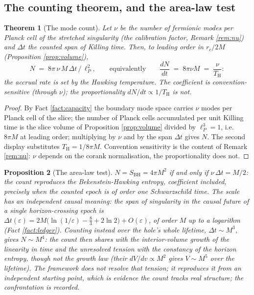 \documentclass[11pt]{article}
\newtheorem{theorem}{Theorem}[section]
\newtheorem{proposition}[theorem]{Proposition}
\theoremstyle{definition}
\renewcommand{\TH}{T_{\mathrm{H}}} %
\newcommand{\lP}{\ell_{P}}
\newcommand{\SBH}{S_{\mathrm{BH}}}
\begin{document}
\subsection{The counting theorem, and the area-law test}\label{subsec:countthm}

\begin{theorem}[The mode count]\label{thm:count}
Let $\nu$ be the number of fermionic modes per Planck cell of the stretched singularity (the calibration factor, Remark \ref{rem:nu}) and $\Delta t$ the counted span of Killing time. Then, to leading order in $r_c/2M$ (Proposition \ref{prop:volume}),
\[
N \;=\; 8\pi\,\nu\,M\,\Delta t\,/\,\lP^2,
\qquad\text{equivalently}\qquad
\frac{dN}{dt} \;=\; 8\pi\nu M \;=\; \frac{\nu}{\TH}:
\]
the accrual rate is set by the Hawking temperature. The coefficient is convention-sensitive (through $\nu$); the proportionality $dN/dt \propto 1/\TH$ is not.
\end{theorem}

\begin{proof}
By Fact \ref{fact:capacity} the boundary mode space carries $\nu$ modes per Planck cell of the slice; the number of Planck cells accumulated per unit Killing time is the slice volume of Proposition \ref{prop:volume} divided by $\lP^3 = 1$, i.e.\ $8\pi M$ at leading order; multiplying by $\nu$ and by the span $\Delta t$ gives $N$. The second display substitutes $\TH = 1/8\pi M$. Convention sensitivity is the content of Remark \ref{rem:nu}: $\nu$ depends on the corank normalisation, the proportionality does not.
\end{proof}

\begin{proposition}[The area-law test]\label{prop:arealaw}
$N = \SBH = 4\pi M^2$ if and only if $\nu\,\Delta t = M/2$: the count reproduces the Bekenstein-Hawking entropy, coefficient included, precisely when the counted epoch is of order one Schwarzschild time. The scale has an independent causal meaning: the span of singularity in the causal future of a single horizon-crossing epoch is $\Delta t(\varepsilon) = 2M\bigl(\ln(1/\varepsilon) - \tfrac83 + 2\ln 2\bigr) + O(\varepsilon)$, of order $M$ up to a logarithm (Fact \ref{fact:ledger}). Counting instead over the hole's whole lifetime, $\Delta t \sim M^3$, gives $N \sim M^4$: the count then shares with the interior-volume growth of \cite{ChristodoulouRovelli2015} the linearity in time and the unresolved tension with the constancy of the horizon entropy, though not the growth law (their $dV/dv \propto M^2$ gives $V \sim M^5$ over the lifetime). The framework does not resolve that tension; it reproduces it from an independent starting point, which is evidence the count tracks real structure; the confrontation is recorded.
\end{proposition}
\end{document}
